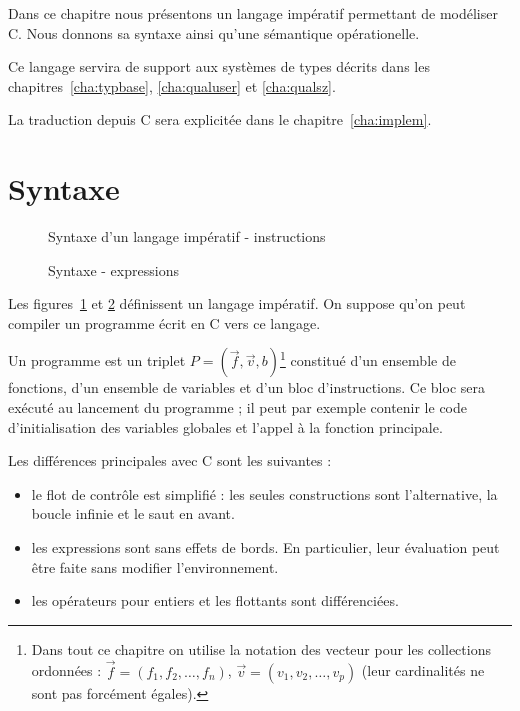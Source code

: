 Dans ce chapitre nous présentons un langage impératif permettant de modéliser C.
Nous donnons sa syntaxe ainsi qu'une sémantique opérationelle.

Ce langage servira de support aux systèmes de types décrits dans les
chapitres~\ref{cha:typbase}, \ref{cha:qualuser} et \ref{cha:qualsz}.

La traduction depuis C sera explicitée dans le chapitre~\ref{cha:implem}.

\section{Syntaxe}

\begin{figure}

\caption{Syntaxe d'un langage impératif - instructions}
\label{fig:syntx}
\end{figure}

\begin{figure}

\caption{Syntaxe - expressions}
\label{fig:syntx-data}
\end{figure}


Les figures~\ref{fig:syntx} et \ref{fig:syntx-data} définissent un langage
impératif. On suppose qu'on peut compiler un programme écrit en C vers ce
langage.

Un programme est un triplet $P = (\vec{f}, \vec{v}, b)$\footnote{Dans tout ce
chapitre on utilise la notation des vecteur pour les collections ordonnées :
$\vec{f} = (f_1, f_2, …, f_n)$, $\vec{v} = (v_1, v_2, …, v_p)$ (leur
cardinalités ne sont pas forcément égales).} constitué d'un ensemble de
fonctions, d'un ensemble de variables et d'un bloc d'instructions. Ce bloc sera
exécuté au lancement du programme ; il peut par exemple contenir le code
d'initialisation des variables globales et l'appel à la fonction principale.


Les différences principales avec C sont les suivantes :

\begin{itemize}
\item
  le flot de contrôle est simplifié : les seules constructions sont
  l'alternative, la boucle infinie et le saut en avant.
\item
  les expressions sont sans effets de bords. En particulier, leur
  évaluation peut être faite sans modifier l'environnement.
\item
  les opérateurs pour entiers et les flottants sont différenciées.
\end{itemize}

